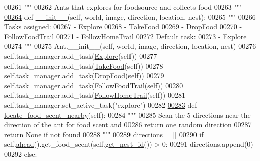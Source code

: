 \begin{DoxyCode}
00261     \textcolor{stringliteral}{"""}
00262 \textcolor{stringliteral}{    Ants that explores for foodsource and collects food}
00263 \textcolor{stringliteral}{    """}
\hypertarget{ants_8py_source_l00264}{}\hyperlink{classants_1_1WorkerAnt_a82e7d37f66c81e029cad6038d6515056}{00264}     \textcolor{keyword}{def }\hyperlink{classants_1_1WorkerAnt_a82e7d37f66c81e029cad6038d6515056}{\_\_init\_\_}(self, world, image, direction, location, nest):
00265         \textcolor{stringliteral}{"""}
00266 \textcolor{stringliteral}{        Tasks assigned:}
00267 \textcolor{stringliteral}{            - Explore}
00268 \textcolor{stringliteral}{            - TakeFood}
00269 \textcolor{stringliteral}{            - DropFood}
00270 \textcolor{stringliteral}{            - FollowFoodTrail}
00271 \textcolor{stringliteral}{            - FollowHomeTrail}
00272 \textcolor{stringliteral}{        Default task:}
00273 \textcolor{stringliteral}{            - Explore}
00274 \textcolor{stringliteral}{        """}
00275         Ant.\_\_init\_\_(self, world, image, direction, location, nest)
00276         self.task\_manager.add\_task(\hyperlink{classtask__manager_1_1Explore}{Explore}(self))
00277         self.task\_manager.add\_task(\hyperlink{classtask__manager_1_1TakeFood}{TakeFood}(self))
00278         self.task\_manager.add\_task(\hyperlink{classtask__manager_1_1DropFood}{DropFood}(self))
00279         self.task\_manager.add\_task(\hyperlink{classtask__manager_1_1FollowFoodTrail}{FollowFoodTrail}(self))
00280         self.task\_manager.add\_task(\hyperlink{classtask__manager_1_1FollowHomeTrail}{FollowHomeTrail}(self))
00281         self.task\_manager.set\_active\_task(\textcolor{stringliteral}{"explore"})
00282 
\hypertarget{ants_8py_source_l00283}{}\hyperlink{classants_1_1WorkerAnt_a3a0836d96b5fe9eba56e9d2d59b555cc}{00283}     \textcolor{keyword}{def }\hyperlink{classants_1_1WorkerAnt_a3a0836d96b5fe9eba56e9d2d59b555cc}{locate\_food\_scent\_nearby}(self):
00284         \textcolor{stringliteral}{"""}
00285 \textcolor{stringliteral}{        Scan the 5 directions near the direction of the ant for food scent and}
00286 \textcolor{stringliteral}{        return one random direction}
00287 \textcolor{stringliteral}{        return None if not found}
00288 \textcolor{stringliteral}{        """}
00289         directions = []
00290         \textcolor{keywordflow}{if} self.\hyperlink{classants_1_1Ant_ac2c8f048d99cd48a5829ddf7ff4a708a}{ahead}().get\_food\_scent(self.\hyperlink{classants_1_1Ant_a10dc42722864d5850912dd34242d5cf8}{get\_nest\_id}()) > 0:
00291             directions.append(0)
00292         \textcolor{keywordflow}{else}:

\end{DoxyCode}
